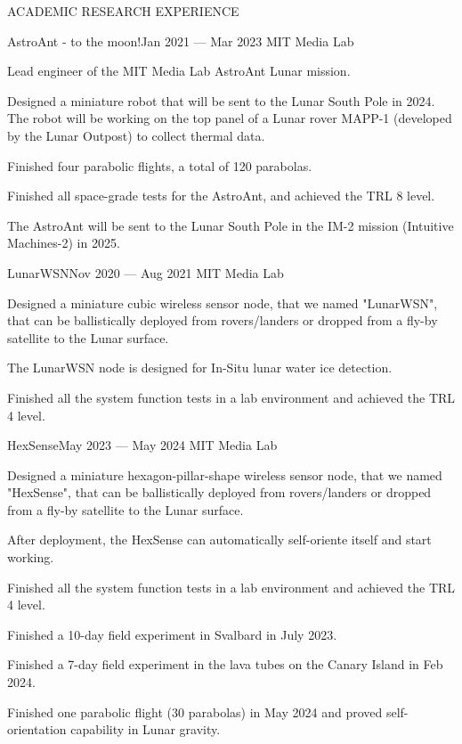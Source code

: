 \documentclass{resume} %
\begin{document}
\begin{rSection}{ACADEMIC RESEARCH EXPERIENCE}
\begin{rSubsection}{AstroAnt - to the moon!}{Jan 2021 --- Mar 2023}{ }{MIT Media Lab}
    \item Lead engineer of the MIT Media Lab AstroAnt Lunar mission.
    \item Designed a miniature robot that will be sent to the Lunar South Pole in 2024.
          The robot will be working on the top panel of a Lunar rover MAPP-1 (developed by the Lunar Outpost)
          to collect thermal data.
    \item Finished four parabolic flights, a total of 120 parabolas.
    \item Finished all space-grade tests for the AstroAnt, and achieved the TRL 8 level.
    \item The AstroAnt will be sent to the Lunar South Pole in the IM-2 mission (Intuitive Machines-2) in 2025.
\end{rSubsection}

\begin{rSubsection}{LunarWSN}{Nov 2020 --- Aug 2021}{ }{MIT Media Lab}
\item Designed a miniature cubic wireless sensor node, that we named "LunarWSN",
      that can be ballistically deployed from rovers/landers or dropped from a fly-by satellite to the Lunar surface.
\item The LunarWSN node is designed for In-Situ lunar water ice detection.
\item Finished all the system function tests in a lab environment and achieved the TRL 4 level.
\end{rSubsection}

\newpage

\begin{rSubsection}{HexSense}{May 2023 --- May 2024}{ }{MIT Media Lab}
\item Designed a miniature hexagon-pillar-shape wireless sensor node, that we named "HexSense",
      that can be ballistically deployed from rovers/landers or dropped from a fly-by satellite to the Lunar surface.
\item After deployment, the HexSense can automatically self-oriente itself and start working.
\item Finished all the system function tests in a lab environment and achieved the TRL 4 level.
\item Finished a 10-day field experiment in Svalbard in July 2023.
\item Finished a 7-day field experiment in the lava tubes on the Canary Island in Feb 2024.
\item Finished one parabolic flight (30 parabolas) in May 2024 and proved self-orientation capability in Lunar gravity.
\end{rSubsection}


\end{rSection}
\end{document}
